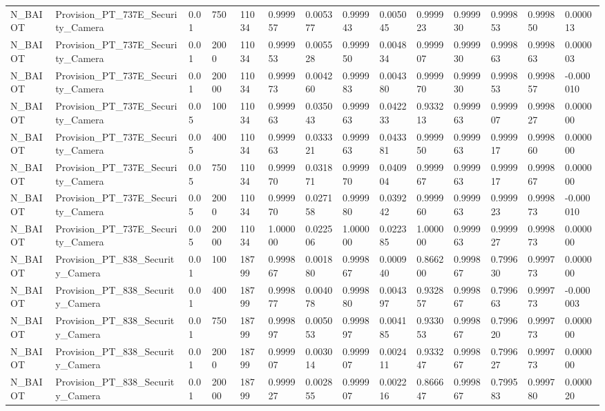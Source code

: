 \begin{tabular}{llllllllllllll}
N\_BAIOT & Provision\_PT\_737E\_Security\_Camera & 0.01 & 750 & 11034 & 0.999957 & 0.005377 & 0.999943 & 0.005045 & 0.999923 & 0.999930 & 0.999853 & 0.999850 & 0.000013 \\
N\_BAIOT & Provision\_PT\_737E\_Security\_Camera & 0.01 & 2000 & 11034 & 0.999953 & 0.005528 & 0.999950 & 0.004834 & 0.999907 & 0.999930 & 0.999863 & 0.999863 & 0.000003 \\
N\_BAIOT & Provision\_PT\_737E\_Security\_Camera & 0.01 & 20000 & 11034 & 0.999973 & 0.004260 & 0.999983 & 0.004380 & 0.999970 & 0.999930 & 0.999853 & 0.999857 & -0.000010 \\
N\_BAIOT & Provision\_PT\_737E\_Security\_Camera & 0.05 & 100 & 11034 & 0.999963 & 0.035043 & 0.999963 & 0.042233 & 0.933213 & 0.999963 & 0.999907 & 0.999827 & 0.000000 \\
N\_BAIOT & Provision\_PT\_737E\_Security\_Camera & 0.05 & 400 & 11034 & 0.999963 & 0.033321 & 0.999963 & 0.043381 & 0.999950 & 0.999963 & 0.999917 & 0.999860 & 0.000000 \\
N\_BAIOT & Provision\_PT\_737E\_Security\_Camera & 0.05 & 750 & 11034 & 0.999970 & 0.031871 & 0.999970 & 0.040904 & 0.999967 & 0.999963 & 0.999917 & 0.999867 & 0.000000 \\
N\_BAIOT & Provision\_PT\_737E\_Security\_Camera & 0.05 & 2000 & 11034 & 0.999970 & 0.027158 & 0.999980 & 0.039242 & 0.999960 & 0.999963 & 0.999923 & 0.999873 & -0.000010 \\
N\_BAIOT & Provision\_PT\_737E\_Security\_Camera & 0.05 & 20000 & 11034 & 1.000000 & 0.022506 & 1.000000 & 0.022385 & 1.000000 & 0.999963 & 0.999927 & 0.999873 & 0.000000 \\
N\_BAIOT & Provision\_PT\_838\_Security\_Camera & 0.01 & 100 & 18799 & 0.999867 & 0.001880 & 0.999867 & 0.000940 & 0.866200 & 0.999867 & 0.799630 & 0.999773 & 0.000000 \\
N\_BAIOT & Provision\_PT\_838\_Security\_Camera & 0.01 & 400 & 18799 & 0.999877 & 0.004078 & 0.999880 & 0.004397 & 0.932857 & 0.999867 & 0.799663 & 0.999773 & -0.000003 \\
N\_BAIOT & Provision\_PT\_838\_Security\_Camera & 0.01 & 750 & 18799 & 0.999897 & 0.005053 & 0.999897 & 0.004185 & 0.933053 & 0.999867 & 0.799620 & 0.999773 & 0.000000 \\
N\_BAIOT & Provision\_PT\_838\_Security\_Camera & 0.01 & 2000 & 18799 & 0.999907 & 0.003014 & 0.999907 & 0.002411 & 0.933247 & 0.999867 & 0.799627 & 0.999773 & 0.000000 \\
N\_BAIOT & Provision\_PT\_838\_Security\_Camera & 0.01 & 20000 & 18799 & 0.999927 & 0.002855 & 0.999907 & 0.002216 & 0.866647 & 0.999867 & 0.799583 & 0.999780 & 0.000020 \\

\end{tabular}
